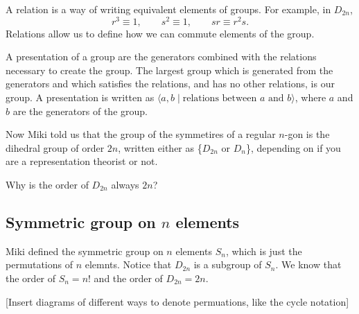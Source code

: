 \begin{definition}[Relations]
A relation is a way of writing equivalent elements of groups. For example, in $D_{2n}$,
\[ r^3 \equiv 1, \qquad s^2 \equiv 1, \qquad sr \equiv r^2s. \]
Relations allow us to define how we can commute elements of the group.
\end{definition}

\begin{definition}[Presentation]
A presentation of a group are the generators combined with the relations necessary to create the group. The largest group which is generated from the generators and which satisfies the relations, and has no other relations, is our group. A presentation is written as $\langle a,b \mid \text{relations between $a$ and $b$} \rangle$, where $a$ and $b$ are the generators of the group.
\end{definition}

Now Miki told us that the group of the  symmetires of a regular $n$-gon is the dihedral group of order $2n$, written either as \{$D_{2n}$ or $D_{n}$\}, depending on if you are a representation theorist or not.

\begin{problem}[HW]
Why is the order of $D_{2n}$ always $2n$?
\end{problem}

\subsection*{Symmetric group on $n$ elements}

Miki defined the symmetric group on $n$ elements $S_n$, which is just the permutations of $n$ elemnts. Notice that $D_{2n}$ is a subgroup of $S_n$. We know that the order of $S_n = n!$ and the order of $D_{2n} = 2n$.

[Insert diagrams of different ways to denote permuations, like the cycle notation]
